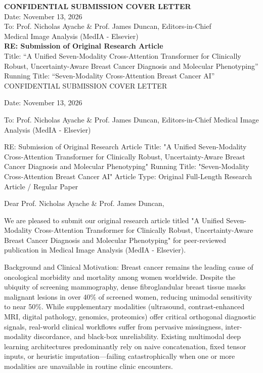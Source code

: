 \documentclass[11pt]{article}
\begin{document}
\noindent\textbf{CONFIDENTIAL SUBMISSION COVER LETTER}\\
\noindent Date: November 13, 2026\\
\noindent To: Prof. Nicholas Ayache & Prof. James Duncan, Editors-in-Chief\\
\noindent Medical Image Analysis (MedIA - Elsevier)\\
\vspace{0.5cm}
\noindent\textbf{RE: Submission of Original Research Article}\\
\noindent Title: ``A Unified Seven-Modality Cross-Attention Transformer for Clinically Robust, Uncertainty-Aware Breast Cancer Diagnosis and Molecular Phenotyping''\\
\noindent Running Title: ``Seven-Modality Cross-Attention Breast Cancer AI''\\
\vspace{0.5cm}
CONFIDENTIAL SUBMISSION COVER LETTER

Date: November 13, 2026

To:
Prof. Nicholas Ayache \& Prof. James Duncan, Editors-in-Chief
Medical Image Analysis (MedIA - Elsevier)

RE: Submission of Original Research Article
Title: "A Unified Seven-Modality Cross-Attention Transformer for Clinically Robust, Uncertainty-Aware Breast Cancer Diagnosis and Molecular Phenotyping"
Running Title: "Seven-Modality Cross-Attention Breast Cancer AI"
Article Type: Original Full-Length Research Article / Regular Paper

Dear Prof. Nicholas Ayache \& Prof. James Duncan,

We are pleased to submit our original research article titled "A Unified Seven-Modality Cross-Attention Transformer for Clinically Robust, Uncertainty-Aware Breast Cancer Diagnosis and Molecular Phenotyping" for peer-reviewed publication in Medical Image Analysis (MedIA - Elsevier).

Background and Clinical Motivation:
Breast cancer remains the leading cause of oncological morbidity and mortality among women worldwide. Despite the ubiquity of screening mammography, dense fibroglandular breast tissue masks malignant lesions in over 40\% of screened women, reducing unimodal sensitivity to near 50\%. While supplementary modalities (ultrasound, contrast-enhanced MRI, digital pathology, genomics, proteomics) offer critical orthogonal diagnostic signals, real-world clinical workflows suffer from pervasive missingness, inter-modality discordance, and black-box unreliability. Existing multimodal deep learning architectures predominantly rely on naive concatenation, fixed tensor inputs, or heuristic imputation—failing catastrophically when one or more modalities are unavailable in routine clinic encounters.
\end{document}
